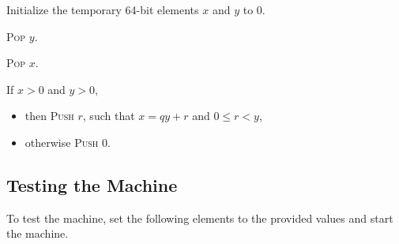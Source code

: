 \documentclass[a4paper,12pt]{article}
\newcommand{\proc}[1]{\textsc{#1}}
\begin{document}
\begin{stepnumbers}[start=3]
\begin{description}
\begin{stepnumbers}
    \item Initialize the temporary 64-bit elements $x$ and $y$ to 0.
    \item \proc{Pop} $y$.
    \item \proc{Pop} $x$.
    \item If $x > 0$ and $y > 0$,
      \begin{itemize}[label=]
      \item then \proc{Push} $r$, such that $x = qy + r$ and $0 \leq r < y$,
      \item otherwise \proc{Push} 0.
      \end{itemize}
    \end{stepnumbers}
  \end{description}
\end{stepnumbers}

\subsection{Testing the Machine}

To test the machine, set the following elements to the provided values and start the machine.
\end{document}
